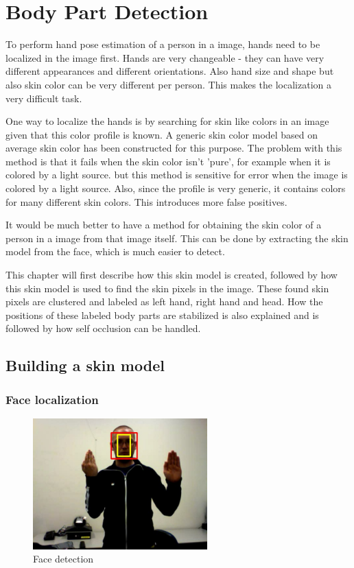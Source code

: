 
\chapter{Body Part Detection}
\label{ch:bodyparts}

To perform hand pose estimation of a person in a image, hands need to be localized in the image first. Hands are very changeable - they can have very different appearances and different orientations. Also hand size and shape but also skin color can be very different per person. This makes the localization a very difficult task. 

One way to localize the hands is by searching for skin like colors in an image given that this color profile is known. A generic skin color model based on average skin color has been constructed for this purpose\cite{Jones1999}. The problem with this method is that it fails when the skin color isn't 'pure', for example when it is colored by a light source. but this method is sensitive for error when the image is colored by a light source. Also, since the profile is very generic, it contains colors for many different skin colors. This introduces more false positives.

It would be much better to have a method for obtaining the skin color of a person in a image from that image itself. This can be done by extracting the skin model from the face, which is much easier to detect.

This chapter will first describe how this skin model is created, followed by how this skin model is used to find the skin pixels in the image. These found skin pixels are clustered and labeled as left hand, right hand and head. How the positions of these labeled body parts are stabilized is also explained and is followed by how self occlusion can be handled.

\section{Building a skin model}
\label{sec:skinmodel}

\subsection*{Face localization}

\begin{figure}
  \center{}
    \includegraphics[width=0.6\textwidth]{figures/pipeline/detected.jpg}
  \caption{Face detection}
  \label{fig:face_detection}
\end{figure}


